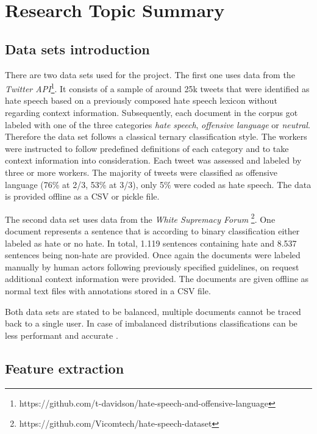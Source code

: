 \section{Research Topic Summary}
\label{section:research}

\subsection{Data sets introduction}

There are two data sets used for the project. The first one \cite{ThomasDavidson.2020} uses data from the \textit{Twitter API}\footnote{https://github.com/t-davidson/hate-speech-and-offensive-language}. It consists of a sample of around 25k tweets that were identified as hate speech based on a previously composed hate speech lexicon without regarding context information. Subsequently, each document in the corpus got labeled with one of the three categories \textit{hate speech}, \textit{offensive language} or \textit{neutral}. Therefore the data set follows a classical ternary classification style. The workers were instructed to follow predefined definitions of each category and to take context information into consideration. Each tweet was assessed and labeled by three or more workers. The majority of tweets were classified as offensive language (76\% at 2/3, 53\% at 3/3), only 5\% were coded as hate speech. The data is provided offline as a CSV or pickle file. 

The second data set uses data from the \textit{White Supremacy Forum} \cite{OnadeGibert.2020}\footnote{https://github.com/Vicomtech/hate-speech-dataset}. One document represents a sentence that is according to binary classification either labeled as hate or no hate. In total, 1.119 sentences containing hate and 8.537 sentences being non-hate are provided. Once again the documents were labeled manually by human actors following previously specified guidelines, on request additional context information were provided. The documents are given offline as normal text files with annotations stored in a CSV file. 

Both data sets are stated to be balanced, multiple documents cannot be traced back to a single user. In case of imbalanced distributions classifications can be less performant and accurate \cite{Oriola.2020}.

\subsection{Feature extraction}

